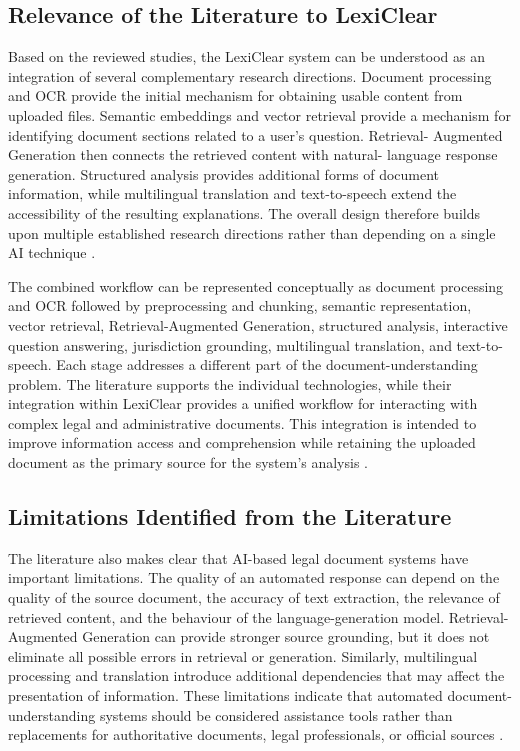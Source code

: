 \documentclass[12pt,a4paper,oneside]{report}
\begin{document}
\subsection{Relevance of the Literature to LexiClear}

Based on the reviewed studies, the LexiClear system can be understood as an
integration of several complementary research directions. Document processing
and OCR provide the initial mechanism for obtaining usable content from
uploaded files. Semantic embeddings and vector retrieval provide a mechanism
for identifying document sections related to a user's question. Retrieval-
Augmented Generation then connects the retrieved content with natural-
language response generation. Structured analysis provides additional forms
of document information, while multilingual translation and text-to-speech
extend the accessibility of the resulting explanations. The overall design
therefore builds upon multiple established research directions rather than
depending on a single AI technique
\cite{pramanik2025,lewis2020rag,ash2024translating}.

The combined workflow can be represented conceptually as document processing
and OCR followed by preprocessing and chunking, semantic representation,
vector retrieval, Retrieval-Augmented Generation, structured analysis,
interactive question answering, jurisdiction grounding, multilingual
translation, and text-to-speech. Each stage addresses a different part of
the document-understanding problem. The literature supports the individual
technologies, while their integration within LexiClear provides a unified
workflow for interacting with complex legal and administrative documents.
This integration is intended to improve information access and comprehension
while retaining the uploaded document as the primary source for the
system's analysis
\cite{pramanik2025,jurisai2025,lewis2020rag}.

\subsection{Limitations Identified from the Literature}

The literature also makes clear that AI-based legal document systems have
important limitations. The quality of an automated response can depend on the
quality of the source document, the accuracy of text extraction, the
relevance of retrieved content, and the behaviour of the language-generation
model. Retrieval-Augmented Generation can provide stronger source grounding,
but it does not eliminate all possible errors in retrieval or generation.
Similarly, multilingual processing and translation introduce additional
dependencies that may affect the presentation of information. These
limitations indicate that automated document-understanding systems should be
considered assistance tools rather than replacements for authoritative
documents, legal professionals, or official sources
\cite{lewis2020rag,es2024ragas}.
\end{document}
